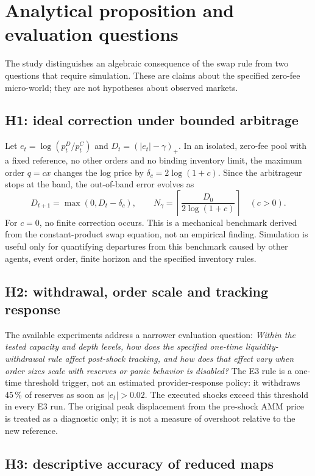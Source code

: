 \chapter{Analytical proposition and evaluation questions}
\label{cap:hipotesis}

The study distinguishes an algebraic consequence of the swap rule from two questions that require simulation. These are claims about the specified zero-fee micro-world; they are not hypotheses about observed markets.

\section{H1: ideal correction under bounded arbitrage}

Let $e_t=\log(p_t^D/p_t^C)$ and $D_t=(|e_t|-\gamma)_+$. In an isolated, zero-fee pool with a fixed reference, no other orders and no binding inventory limit, the maximum order $q=cx$ changes the log price by $\delta_c=2\log(1+c)$. Since the arbitrageur stops at the band, the out-of-band error evolves as
\[
  D_{t+1}=\max(0,D_t-\delta_c),\qquad
  N_\gamma=\left\lceil\frac{D_0}{2\log(1+c)}\right\rceil \quad(c>0).
\]
For $c=0$, no finite correction occurs. This is a mechanical benchmark derived from the constant-product swap equation, not an empirical finding. Simulation is useful only for quantifying departures from this benchmark caused by other agents, event order, finite horizon and the specified inventory rules.

\section{H2: withdrawal, order scale and tracking response}

The available experiments address a narrower evaluation question:
\emph{Within the tested capacity and depth levels, how does the specified one-time liquidity-withdrawal rule affect post-shock tracking, and how does that effect vary when order sizes scale with reserves or panic behavior is disabled?}
The E3 rule is a one-time threshold trigger, not an estimated provider-response policy: it withdraws 45\,\% of reserves as soon as $|e_t|>0.02$. The executed shocks exceed this threshold in every E3 run. The original peak displacement from the pre-shock AMM price is treated as a diagnostic only; it is not a measure of overshoot relative to the new reference.

\section{H3: descriptive accuracy of reduced maps}

